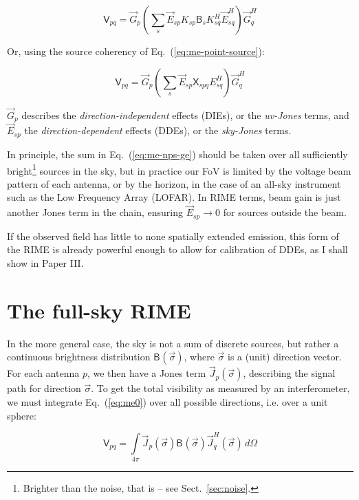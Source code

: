 \documentclass[referee]{aa}
\newcommand{\herm}{H}
\newcommand{\jones}[2]{\vec {#1}_{#2}}
\newcommand{\jonesT}[2]{\vec {#1}^{\herm}_{#2}}
\newcommand{\coh}[2]{\mathsf{{#1}}_{{#2}}}
\begin{document}
  \begin{equation}\label{eq:me-nps-gek}
  \coh{V}{pq} = \jones{G}{p} \left ( \sum_{s}{\jones{E}{sp} K_{sp} \coh{B}{s} K^\herm_{sq} \jonesT{E}{sq}} \right ) \jonesT{G}{q}
  \end{equation}

Or, using the source coherency of Eq.~(\ref{eq:me-point-source}):

  \begin{equation}\label{eq:me-nps-ge}
  \coh{V}{pq} = \jones{G}{p} \left ( \sum_{s}{\jones{E}{sp} \coh{X}{spq} E^\herm_{sq}} \right ) \jonesT{G}{q}
  \end{equation}

$\jones{G}{p}$ describes the {\em direction-independent} effects (DIEs), or the \emph{uv-Jones} terms, and $\jones{E}{sp}$ the {\em  direction-dependent} effects (DDEs), or the \emph{sky-Jones} terms. 

In principle, the sum in Eq.~(\ref{eq:me-nps-ge}) should be taken over all sufficiently bright\footnote{Brighter than the noise, that is -- see Sect.~\ref{sec:noise}.} sources in the sky, but in practice our FoV is limited by the voltage beam pattern of each antenna, or by the horizon, in the case of an all-sky instrument such as the Low Frequency Array (LOFAR). In RIME terms, beam gain is just another Jones term in the chain, ensuring $\jones{E}{sp}\to 0$ for sources outside the beam.

If the observed field has little to none spatially extended emission, this form of the RIME is already powerful enough to allow for calibration of DDEs, as I shall show in Paper III.

\section{The full-sky RIME\label{sec:full-sky-rime}}

In the more general case, the sky is not a sum of discrete sources, but rather a continuous brightness distribution $\coh{B}{}(\vec\sigma)$, where $\vec\sigma$ is a (unit) direction vector. For each antenna $p$, we then have a Jones term $\jones{J}{p}(\vec\sigma)$, describing the signal path for direction $\vec\sigma$. To get the total visibility as measured by an interferometer, we must integrate Eq.~(\ref{eq:me0}) over all possible directions, i.e. over a unit sphere:

\[
\coh{V}{pq} = \int\limits_{4\pi} \jones{J}{p}(\vec\sigma) \coh{B}{}(\vec\sigma) \jonesT{J}{q}(\vec\sigma) \, d\Omega
\]
\end{document}
